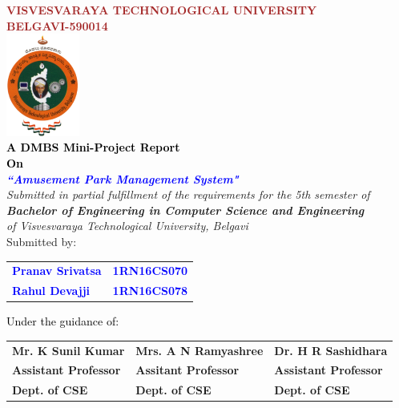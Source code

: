 
\begin{titlepage}
\begin{center}
\break\break
\textup{\large {\textcolor{brown}{\bf VISVESVARAYA TECHNOLOGICAL UNIVERSITY} \\ {\textcolor{brown}{\bf BELGAVI-590014}}}}\\[0.1in]
\includegraphics[width=0.18\textwidth]{./VTU.png}\\[0.1in]
\textup{\small {\textcolor{black}{\textbf {A DMBS Mini-Project Report} \\ {\textbf {On}}}}} \\[0.2in]
\textup{\large {\textcolor{blue}{\textbf {\textit {``Amusement Park Management System"}}}}} \\[0.2in]
\textup{{\textit {Submitted in partial fulfillment of the requirements for the 5th semester of} \\ {\textbf {\textit {Bachelor of Engineering in Computer Science and Engineering}} \\ \textit {of Visvesvaraya Technological University, Belgavi}}}}\\[0.15in]
\textup{Submitted by:}
\break\break
\begin{tabular}{l  l}
\textcolor{blue}{\textbf{Pranav Srivatsa}} & \textcolor{blue}{\hspace{2.7cm}\textbf{1RN16CS070}}\\[0.3in]
\textcolor{blue}{\textbf{Rahul Devajji}} & \textcolor{blue}{\hspace{2.7cm}\textbf{1RN16CS078}}\\
\end{tabular}
\break\break\break\break
\textup{\normalsize {\textcolor{black}{ Under the guidance of:}}}\break\break
\begin{tabular}{l l l}
\textbf{Mr. K Sunil Kumar} & \hspace{0.7cm}\textbf{Mrs. A N Ramyashree} & \hspace{0.7cm}\textbf{Dr. H R Sashidhara}\\
\textbf{Assistant Professor} & \hspace{0.7cm}\textbf{Assitant Professor}  & \hspace{0.7cm}\textbf{Assistant Professor}\\
\textbf{Dept. of CSE} & \hspace{0.7cm}\textbf{Dept. of CSE}  & \hspace{0.7cm}\textbf{Dept. of CSE}\\[0.1in]
\end{tabular}


\end{center}
\end{titlepage}
